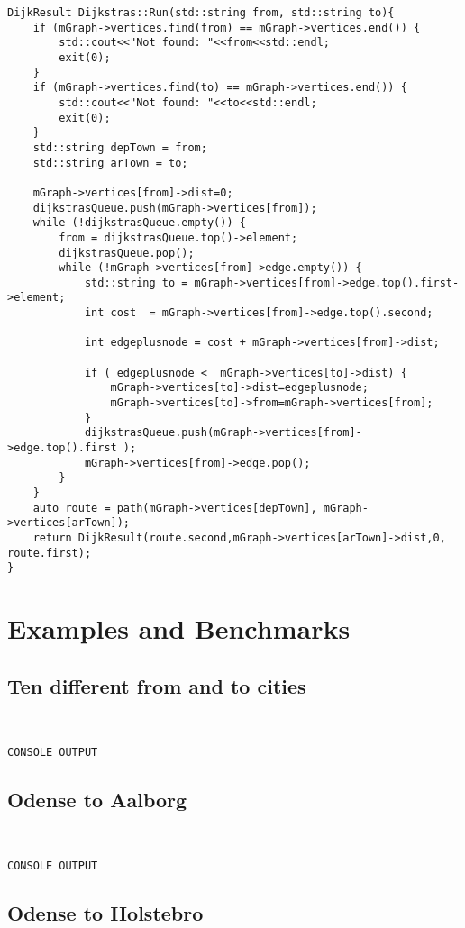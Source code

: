 \begin{lstlisting}
DijkResult Dijkstras::Run(std::string from, std::string to){
	if (mGraph->vertices.find(from) == mGraph->vertices.end()) {
		std::cout<<"Not found: "<<from<<std::endl;
		exit(0);
	}
	if (mGraph->vertices.find(to) == mGraph->vertices.end()) {
		std::cout<<"Not found: "<<to<<std::endl;
		exit(0);
	}
	std::string depTown = from;
	std::string arTown = to;

	mGraph->vertices[from]->dist=0;
	dijkstrasQueue.push(mGraph->vertices[from]);
	while (!dijkstrasQueue.empty()) {
		from = dijkstrasQueue.top()->element;
		dijkstrasQueue.pop();
		while (!mGraph->vertices[from]->edge.empty()) {
			std::string to = mGraph->vertices[from]->edge.top().first->element;
			int cost  = mGraph->vertices[from]->edge.top().second;

			int edgeplusnode = cost + mGraph->vertices[from]->dist;

			if ( edgeplusnode <  mGraph->vertices[to]->dist) {
				mGraph->vertices[to]->dist=edgeplusnode;
				mGraph->vertices[to]->from=mGraph->vertices[from];
			}
			dijkstrasQueue.push(mGraph->vertices[from]->edge.top().first );
			mGraph->vertices[from]->edge.pop();
		}
	}
	auto route = path(mGraph->vertices[depTown], mGraph->vertices[arTown]);
	return DijkResult(route.second,mGraph->vertices[arTown]->dist,0, route.first);
}
\end{lstlisting}

\section{Examples and Benchmarks}
\subsection{Ten different from and to cities}
\begin{lstlisting}


CONSOLE OUTPUT

\end{lstlisting}


\subsection{Odense to Aalborg}
\begin{lstlisting}


CONSOLE OUTPUT

\end{lstlisting}

	
\subsection{Odense to Holstebro}

